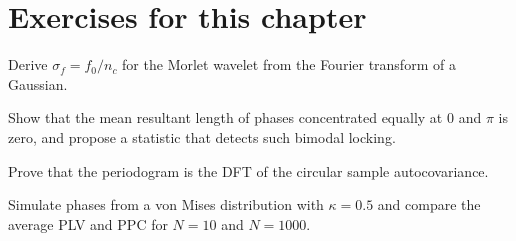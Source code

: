 \section*{Exercises for this chapter}
\begin{exercise}
Derive $\sigma_f=f_0/n_c$ for the Morlet wavelet from the Fourier
transform of a Gaussian.
\end{exercise}
\begin{exercise}
Show that the mean resultant length of phases concentrated equally at
$0$ and $\pi$ is zero, and propose a statistic that detects such
bimodal locking.
\end{exercise}
\begin{exercise}
Prove that the periodogram is the DFT of the circular sample
autocovariance.
\end{exercise}
\begin{exercise}
Simulate phases from a von Mises distribution with $\kappa=0.5$ and
compare the average PLV and PPC for $N=10$ and $N=1000$.
\end{exercise}
